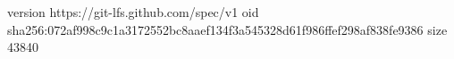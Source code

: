 version https://git-lfs.github.com/spec/v1
oid sha256:072af998c9c1a3172552bc8aaef134f3a545328d61f986ffef298af838fe9386
size 43840

